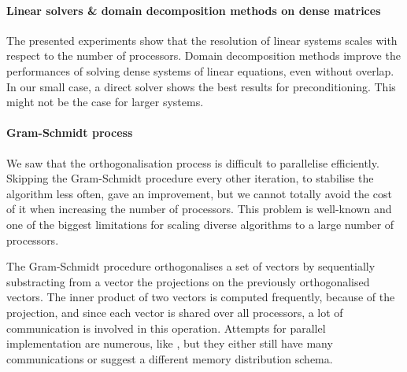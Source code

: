\paragraph{Linear solvers \& domain decomposition methods on dense matrices}
The presented experiments show that the resolution of linear systems scales with respect to the number of processors.
Domain decomposition methods improve the performances of solving dense systems of linear equations, even without overlap.
In our small case, a direct solver shows the best results for preconditioning.
This might not be the case for larger systems. %

\paragraph{Gram-Schmidt process}
We saw that the orthogonalisation process is difficult to parallelise efficiently.
Skipping the Gram-Schmidt procedure every other iteration, to stabilise the algorithm less often, gave an improvement, but we cannot totally avoid the cost of it when increasing the number of processors.
This problem is well-known and one of the biggest limitations for scaling diverse algorithms to a large number of processors.

The Gram-Schmidt procedure orthogonalises a set of vectors by sequentially substracting from a vector the projections on the previously orthogonalised vectors.
The inner product of two vectors is computed frequently, because of the projection, and since each vector is shared over all processors, a lot of communication is involved in this operation.
Attempts for parallel implementation are numerous, like \cite{katagiri_parallel_gram_schmidt_2003}, but they either still have many communications or suggest a different memory distribution schema.

